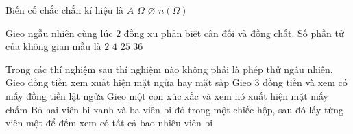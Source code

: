 

\begin{ex}%
	Biến cố chắc  chắn kí hiệu là
	\choice 
		 {$A$}
		{\True  $\Omega$}
		{$\varnothing$} 
		 {$n\left(\Omega\right)$ }
\end{ex}

\begin{ex}%
	Gieo ngẫu nhiên cùng lúc  $2$ đồng xu phân biệt cân đối và đồng chất. Số phần tử của không gian mẫu là
	\choice 
		{$2$} 
		{\True $4$} 
		 {$25$}
		 {$36$}
\end{ex}

\begin{ex}%
	Trong các thí nghiệm sau thí nghiệm nào  không phải là phép thử ngẫu nhiên.
	\choice 
		{Gieo đồng tiền xem xuất hiện mặt ngửa hay  mặt sấp}
		{Gieo 3 đồng tiền  và xem có mấy đồng tiền lật ngửa}
		{Gieo một con  xúc xắc và xem nó xuất hiện mặt mấy chấm}
		{\True Bỏ hai viên bi xanh và ba viên bi đỏ trong một chiếc hộp, sau đó lấy  từng viên một để đếm xem có tất cả bao nhiêu viên bi}
\end{ex}



